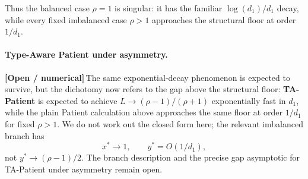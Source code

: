 \documentclass{article}
\theoremstyle{plain}
\theoremstyle{definition}
\newcommand{\open}{\textcolor{openred}{\textbf{[Open / numerical]}}\,}
\begin{document}
Thus the balanced case $\rho=1$ is singular: it has the familiar $\log(d_1)/d_1$ decay, while every fixed imbalanced case $\rho>1$ approaches the structural floor at order $1/d_1$.
 
\paragraph{Type-Aware Patient under asymmetry.}
\open The same exponential-decay phenomenon is expected to survive, but the dichotomy now refers to the gap above the structural floor: \textbf{TA-Patient} is expected to achieve $L\to(\rho-1)/(\rho+1)$ exponentially fast in $d_1$, while the plain Patient calculation above approaches the same floor at order $1/d_1$ for fixed $\rho>1$. We do not work out the closed form here; the relevant imbalanced branch has
\[
x^\ast\to 1,\qquad y^\ast=O(1/d_1),
\]
not $y^\ast\to(\rho-1)/2$. The branch description and the precise gap asymptotic for TA-Patient under asymmetry remain open.
 


\end{document}
